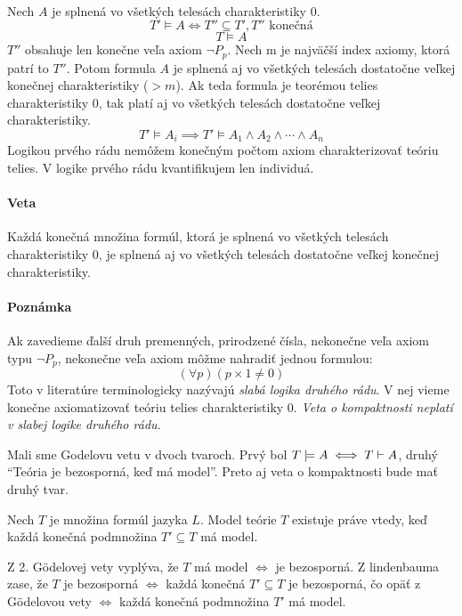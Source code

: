 \paragraph{}
Nech $A$ je splnená vo všetkých telesách charakteristiky 0.
 $$ T' \models A \iff T'' \subseteq T', T''\mbox{ konečná} $$
 $$ T \models A $$
$T''$ obsahuje len konečne veľa axiom $\neg P_p$. Nech m je najväčší index
axiomy, ktorá patrí to $T''$. Potom formula $A$ je splnená aj vo všetkých telesách dostatočne
veľkej konečnej charakteristiky ($>m$). Ak teda formula je teorémou telies
charakteristiky $0$, tak platí aj vo všetkých telesách dostatočne veľkej charakteristiky.
$$ T' \models A_i \implies T' \models A_1 \land A_2 \land \cdots \land A_n $$
Logikou prvého rádu nemôžem konečným počtom axiom charakterizovať teóriu telies.
V logike prvého rádu kvantifikujem len individuá.

\paragraph{Veta}
Každá konečná množina formúl, ktorá je splnená vo všetkých telesách charakteristiky 0,
je splnená aj vo všetkých telesách dostatočne veľkej konečnej charakteristiky.

\paragraph{Poznámka}
Ak zavedieme ďalší druh premenných, prirodzené čísla, nekonečne veľa axiom
typu $\neg P_p$, nekonečne veľa axiom môžme nahradiť jednou formulou:
$$ (\forall p)(p\times 1\not=0)$$
Toto v literatúre terminologicky nazývajú \emph{slabá logika druhého rádu}. V nej
vieme konečne axiomatizovať teóriu telies charakteristiky 0.
\emph{Veta o kompaktnosti neplatí v slabej logike druhého rádu.}

\stopFIXME

Mali sme Godelovu vetu v dvoch tvaroch. Prvý bol
$ T \models A \iff T \vdash A$, druhý ``Teória je bezosporná, keď
má model''. Preto aj veta o kompaktnosti bude mať druhý tvar.

\begin{veta}
    Nech $T$ je množina formúl jazyka $L$. 
    Model teórie $T$ existuje práve vtedy, keď každá konečná podmnožina
    $T' \subseteq T$ má model.
\end{veta}

\begin{dokaz}
    Z 2. G\"odelovej vety vyplýva, že $T$ má model $\iff$ je bezosporná.
    Z lindenbauma zase, že $T$ je bezosporná $\iff$ každá konečná
    $T' \subseteq T$ je bezosporná, čo opäť z G\"odelovou vety
    $\iff$ každá konečná podmnožina $T'$ má model.
\end{dokaz}

